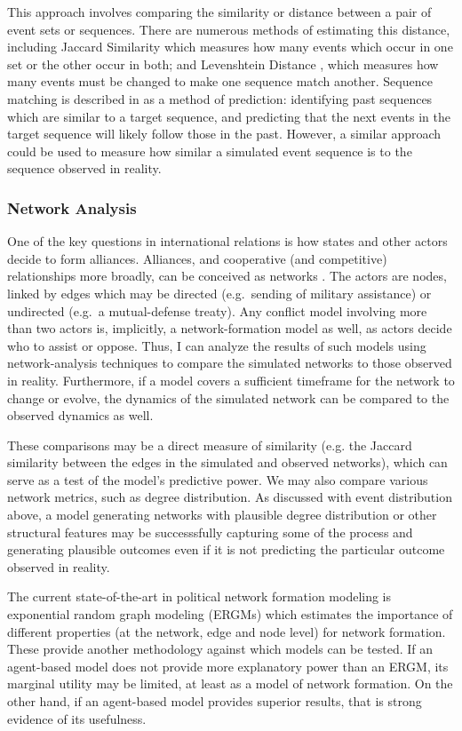 This approach involves comparing the similarity or distance between a pair of event sets or sequences. There are numerous methods of estimating this distance, including Jaccard Similarity \citep{tan_2005} which measures how many events which occur in one set or the other occur in both; and Levenshtein Distance \citep{levenshtein_1966}, which measures how many events must be changed to make one sequence match another. Sequence matching is described in \citet{schrodt_2004} as a method of prediction: identifying past sequences which are similar to a target sequence, and predicting that the next events in the target sequence will likely follow those in the past. However, a similar approach could be used to measure how similar a simulated event sequence is to the sequence observed in reality.

\subsubsection{Network Analysis}\label{network-analysis}

One of the key questions in international relations is how states and other actors decide to form alliances. Alliances, and cooperative (and competitive) relationships more broadly, can be conceived as networks \citep{maoz_2010}. The actors are nodes, linked by edges which may be directed (e.g.~sending of military assistance) or undirected (e.g.~a mutual-defense treaty). Any conflict model involving more than two actors is, implicitly, a network-formation model as well, as actors decide who to assist or oppose. Thus, I can analyze the results of such models using network-analysis techniques to compare the simulated networks to those observed in reality. Furthermore, if a model covers a sufficient timeframe for the network to change or evolve, the dynamics of the simulated network can be compared to the observed dynamics as well.

These comparisons may be a direct measure of similarity (e.g. the Jaccard similarity between the edges in the simulated and observed networks), which can serve as a test of the model's predictive power. We may also compare various network metrics, such as degree distribution. As discussed with event distribution above, a model generating networks with plausible degree distribution or other structural features may be successsfully capturing some of the process and generating plausible outcomes even if it is not predicting the particular outcome observed in reality.

The current state-of-the-art in political network formation modeling is exponential random graph modeling (ERGMs) \citep{robins_2007} which estimates the importance of different properties (at the network, edge and node level) for network formation. These provide another methodology against which models can be tested. If an agent-based model does not provide more explanatory power than an ERGM, its marginal utility may be limited, at least as a model of network formation. On the other hand, if an agent-based model provides superior results, that is strong evidence of its usefulness.